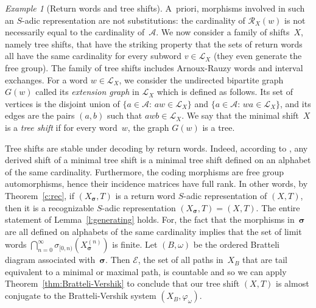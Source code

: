 \documentclass{amsart}
\theoremstyle{definition}
\theoremstyle{remark}
\newtheorem{example}[lemma]{Example}
\numberwithin{equation}{section}
\begin{document}
\begin{example}[Return words and tree shifts]
A~priori, morphisms involved in such an $S$-adic representation are not substitutions: the  cardinality of $\mathcal{R}_X(w)$ is not necessarily equal to the cardinality of~$\mathcal{A}$.
We now consider a family of shifts~$X$, namely tree shifts, that have the striking property that  the sets of return words all have the same cardinality for every subword $v \in \mathcal{L}_X$ (they even generate the free group).
The family of tree shifts \cite{BerDeFel} includes Arnoux-Rauzy words and interval exchanges.
For a word $w \in \mathcal{L}_X$, we consider the undirected bipartite graph $G(w)$ called its \emph{extension graph} in $\mathcal{L}_X$ which is defined as follows.
Its set of vertices is the disjoint union of $\{a \in \mathcal{A}:\, aw \in  \mathcal{L}_X\}$ and $\{a \in \mathcal{A}:\, wa \in  \mathcal{L}_X\}$, and its edges are the pairs $(a,b)$ such that $awb \in \mathcal{L}_X$. 
We say that  the minimal shift~$X$ is a \emph{tree shift} if for every word~$w$, the graph $G(w)$ is a tree.

Tree shifts are stable under decoding by return words. 
Indeed, according to \cite[Theorem~5.13]{BerDeFel}, any derived shift of a minimal tree shift is a minimal tree shift defined on an alphabet of the same cardinality. 
Furthermore, the coding morphisms are free group automorphisms, hence their incidence matrices have full rank. 
In other words, by Theorem~\ref{c:rec}, if $(X_{\boldsymbol{\sigma}},T)$ is a return word $S$-adic representation of $(X,T)$, then it is a recognizable $S$-adic representation $(X_{\boldsymbol{\sigma}},T)=(X,T)$.  
The entire statement of Lemma~\ref{l:generating} holds. 
For, the fact that the morphisms in~$\boldsymbol{\sigma}$ are all defined on alphabets of the same cardinality implies that the set of limit words $\bigcap_{n=0}^{\infty} \sigma_{[0,n)}(X_{\boldsymbol{\sigma}}^{(n)})$ is finite. 
Let $(B,\omega)$ be the ordered Bratteli diagram associated with~$\boldsymbol{\sigma}$. Then $\mathcal{E}$, the set of all paths in~$X_B$ that are tail equivalent to a minimal or maximal path, is countable and so we can apply Theorem~\ref{thm:Bratteli-Vershik} to conclude that our tree shift $(X,T)$ is almost conjugate to the Bratteli-Vershik system $(X_B,\varphi_\omega)$. 


\end{example}
\end{document}
